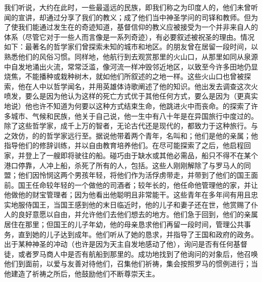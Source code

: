 我们听说，大约在此时，一些最遥远的民族，即我们称之为印度人的，他们未曾听闻的宣讲，却通过分享了我们的教义；成了他们当中神圣学问的司铎和教师。但为了使我们能通过发生在的奇迹知道，基督信仰的教义应被接受为一个并非来自人的体系（尽管它对于一些人而言像是一系列奇迹），有必要叙述被祝圣的理由。情况如下：最著名的哲学家们曾探索未知的城市和地区。的朋友曾在居留一段时间，以熟悉他们的风俗习惯。同样地，他航行到去观赏那里的火山口，从那里如同从泉源中自发地涌出火流，常常泛滥，像河流一样冲毁邻近地区，以致至今许多田地仍显烧焦，不能播种或栽种树木，就如他们所叙述的之地一样。这些火山口也曾被探索，他在人中以哲学闻名，并用英雄体诗歌阐述了他的知识。他出发去调查这次火喷发，要么是因为他认为这样的死亡方式优于其他任何方式，要么是因为（更真实地说）他也许不知道为何要以这种方式结束生命，他跳进火中而丧命。的探索了许多城市、气候和民族，他关于自己说，他一生中有八十年是在异国旅行中度过的。除了这些哲学家，成千上万的智者，无论古代还是现代的，都致力于这种旅行。与之效仿，的的哲学家远行至。据说他带着两个青年，名叫和；他们是他的亲属；他指导他们的修辞训练，并以自由教育培养他们。在尽可能探索了之后，他启程回家，并登上了一艘即将驶往的船。碰巧由于缺水或其他必需品，船只不得不在某个港口停靠，人冲上船，杀死了所有的人，包括。这些人刚刚解除了与罗马人的同盟；他们因怜悯这两个男孩年轻，将他们作为活俘虏带走，并带到了他们的国王面前。国王任命较年轻的一个做他的司酒者；较年长的，他任命他管理他的家，并让他做他的财宝管理者；因为他看出他聪明且非常能干。这些青年在多年间有用且忠实地服侍国王，当国王感到他的末日临近时，他的儿子和妻子还在世，他赏赐了仆人的良好意愿以自由，并允许他们去他们想去的地方。他们急于回到，他们的亲属居住在那里；但国王的儿子年幼，他的母亲恳求他们再留一段时间，管理公共事务，直到她的儿子达到成年。他们听从了她的恳求，并指导了王国和政府的政务。出于某种神圣的冲动（也许是因为天主自发地感动了他），询问是否有任何基督徒，或者罗马商人中是否有航船到那里的。成功地找到了他询问的对象后，他召唤他们到面前，以爱与友善对待他们，召集他们祈祷，集会按照罗马的惯例进行；当他建造了祈祷之所后，他鼓励他们不断尊崇天主。\par

